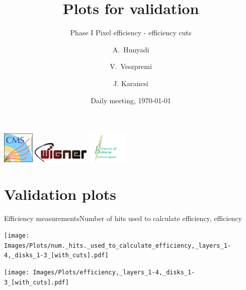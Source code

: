 \documentclass{beamer}
\title{Plots for validation}
\subtitle{Phase I Pixel efficiency - efficiency cuts\vspace*{-0.5cm}}
\author{A.~Hunyadi\inst{1,2} \and V.~Veszpremi\inst{1} \and J. Karancsi\inst{2}}
\institute[] %
{
  \inst{1}%
  Wigner Research Centre for Physics, Budapest
  \and
  \inst{2}%
  University of Debrecen, Debrecen
}
\date{Daily meeting, \today}
\begin{document}
\begin{frame}
  \vspace*{-0.3cm}
  \titlepage
  \vspace*{-0.5cm}
  \begin{center}
  \includegraphics[height=1.5cm]{Images/cms_logo.png}\hspace*{0.3cm}
  \includegraphics[height=1.0cm]{Images/wigner_logo.png}\hspace*{0.4cm}
  \includegraphics[height=1.5cm]{Images/egyetem_logo.png}
  \end{center}
\end{frame}

\section{Validation plots}

\begin{frame}{Efficiency measurements}{Number of hits used to calculate efficiency, efficiency}
  \begin{minipage}{0.45\textwidth}
    \centering
    \texttt{[image: Images/Plots/num.\_hits.\_used\_to\_calculate\_efficiency,\_layers\_1-4,\_disks\_1-3\_[with\_cuts].pdf]}
  \end{minipage}%
  \hspace{0.01\textwidth}%
  \begin{minipage}{0.45\textwidth}
    \centering
    \texttt{[image: Images/Plots/efficiency,\_layers\_1-4,\_disks\_1-3\_[with\_cuts].pdf]}
  \end{minipage}%
\end{frame}
\end{document}

